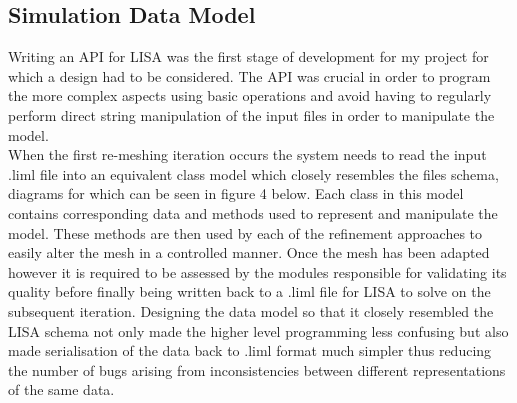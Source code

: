 \subsection{Simulation Data Model}
Writing an API for LISA was the first stage of development for my project for which a design had to be considered. The API was crucial in order to program the more complex aspects using basic operations and avoid having to regularly perform direct string manipulation of the input files in order to manipulate the model. \\

\noindent
When the first re-meshing iteration occurs the system needs to read the input .liml file into an equivalent class model which closely resembles the files schema, diagrams for which can be seen in figure 4 below. Each class in this model contains corresponding data and methods used to represent and manipulate the model. These methods are then used by each of the refinement approaches to easily alter the mesh in a controlled manner. Once the mesh  has been adapted however it is required to be assessed by the modules responsible for validating its quality before finally being written back to a .liml file for LISA to solve on the subsequent iteration. Designing the data model so that it closely resembled the LISA schema not only made the higher level programming less confusing but also made serialisation of the data back to .liml format much simpler  thus reducing the number of bugs arising from inconsistencies between different representations of the same data. \\

